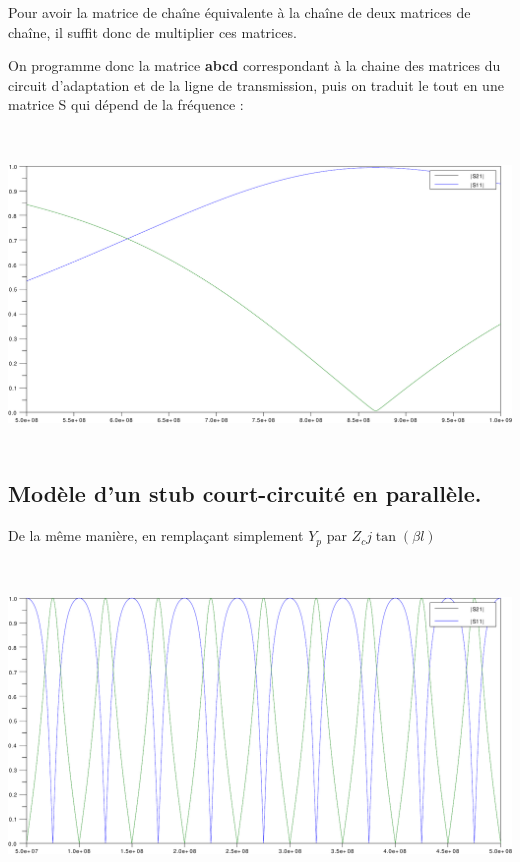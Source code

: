 \documentclass[10pt]{article}
\begin{document}
\begin{itemize}
        Pour avoir la matrice de chaîne équivalente à la chaîne de deux matrices de chaîne, il suffit donc de multiplier ces matrices.

        On programme donc la matrice \textbf{abcd} correspondant à la chaine des matrices du circuit d'adaptation et de la ligne de transmission, puis on traduit le tout en une matrice S qui dépend de la fréquence : 

        \inputminted[linenos,firstline=27,firstnumber=27,lastline=49]{matlab}{src/BE.m}

        \includegraphics[width=\linewidth,height=8cm]{img/1c}

\end{itemize}

\subsection{Modèle d'un stub court-circuité en parallèle.}
De la même manière, en remplaçant simplement $Y_p$ par $Z_c j \tan(\beta l)$

\inputminted[linenos,firstline=50,firstnumber=50]{matlab}{src/BE.m}

\includegraphics[width=\linewidth,height=8cm]{img/1d}
\end{document}
